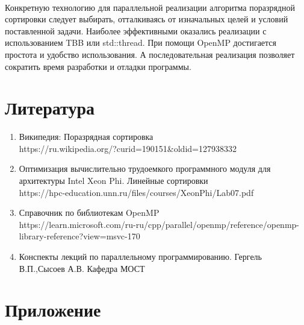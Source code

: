 \documentclass[12pt,a4paper]{article}
\begin{document}
\paragraph{}Конкретную технологию для параллельной реализации алгоритма поразрядной сортировки следует выбирать, отталкиваясь от изначальных целей и условий поставленной задачи. Наиболее эффективными оказались реализации с использованием TBB или std::thread. При помощи OpenMP достигается простота и удобство использования. А последовательная реализация позволяет сократить время разработки и отладки программы.

\newpage
\part*{Литература}
\begin{enumerate} 
\item Википедия: Поразрядная сортировка \\
https://ru.wikipedia.org/?curid=190151\&oldid=127938332
\item Оптимизация вычислительно трудоемкого программного модуля для архитектуры Intel Xeon Phi. Линейные сортировки
 \\https://hpc-education.unn.ru/files/courses/XeonPhi/Lab07.pdf
\item Справочник по библиотекам OpenMP \\https://learn.microsoft.com/ru-ru/cpp/parallel/openmp/reference/openmp-library-reference?view=msvc-170
\item Конспекты лекций по параллельному программированию. Гергель В.П.,Сысоев А.В. Кафедра МОСТ
\end{enumerate} 

\newpage
\part*{Приложение}
\end{document}
